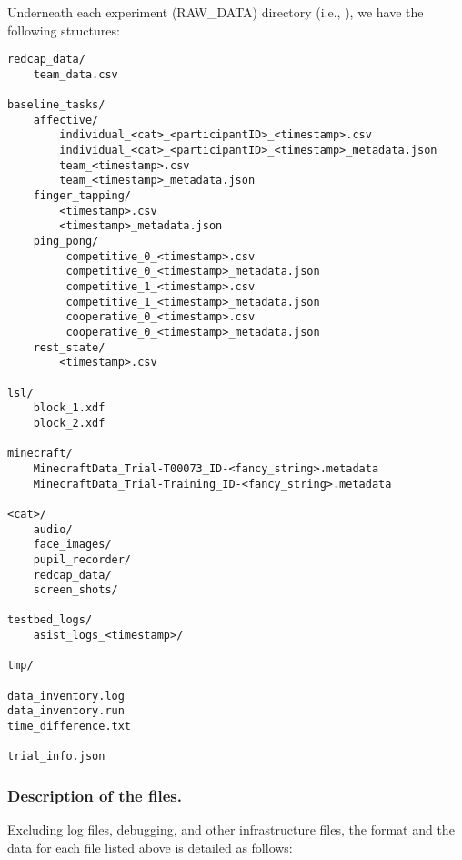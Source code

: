Underneath each experiment (RAW\_DATA) directory (i.e.,
), we have the following structures:
\begin{verbatim}
redcap_data/
    team_data.csv 

baseline_tasks/
    affective/
        individual_<cat>_<participantID>_<timestamp>.csv
        individual_<cat>_<participantID>_<timestamp>_metadata.json
        team_<timestamp>.csv
        team_<timestamp>_metadata.json
    finger_tapping/
        <timestamp>.csv
        <timestamp>_metadata.json
    ping_pong/
         competitive_0_<timestamp>.csv
         competitive_0_<timestamp>_metadata.json
         competitive_1_<timestamp>.csv
         competitive_1_<timestamp>_metadata.json
         cooperative_0_<timestamp>.csv
         cooperative_0_<timestamp>_metadata.json
    rest_state/
        <timestamp>.csv

lsl/
    block_1.xdf
    block_2.xdf
       
minecraft/
    MinecraftData_Trial-T00073_ID-<fancy_string>.metadata
    MinecraftData_Trial-Training_ID-<fancy_string>.metadata

<cat>/
    audio/
    face_images/
    pupil_recorder/
    redcap_data/
    screen_shots/

testbed_logs/
    asist_logs_<timestamp>/

tmp/
    
data_inventory.log
data_inventory.run
time_difference.txt

trial_info.json
\end{verbatim}

\subsubsection{Description of the files.}

\noindent 
Excluding log files, debugging, and other infrastructure files, the format and
the data for each file listed
above is detailed as follows: \\


